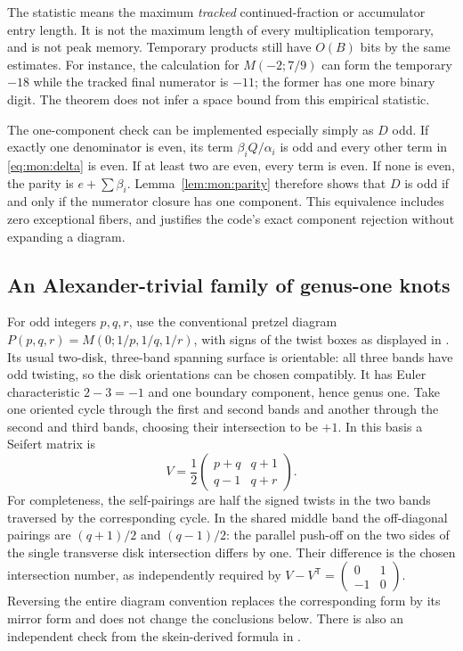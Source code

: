 The statistic  means the maximum \emph{tracked}
continued-fraction or accumulator entry length. It is not the maximum length
of every multiplication temporary, and is not peak memory. Temporary
products still have $O(B)$ bits by the same estimates.
For instance, the calculation for $M(-2;7/9)$ can form the temporary $-18$
while the tracked final numerator is $-11$; the former has one more binary
digit. The theorem does not infer a space bound from this empirical statistic.

The one-component check can be implemented especially simply as $D$ odd.
If exactly one denominator is even, its term $\beta_i Q/\alpha_i$ is odd
and every other term in \eqref{eq:mon:delta} is even. If at least two are
even, every term is even. If none is even, the parity is
$e+\sum\beta_i$. Lemma~\ref{lem:mon:parity} therefore shows that $D$ is odd
if and only if the numerator closure has one component. This equivalence
includes zero exceptional fibers, and justifies the code's exact component
rejection without expanding a diagram.

\subsection{An Alexander-trivial family of genus-one knots}

For odd integers $p,q,r$, use the conventional pretzel diagram
$P(p,q,r)=M(0;1/p,1/q,1/r)$, with signs of the twist boxes as displayed in
\cite[Figure~1 and Theorem~1(3)]{belousov-pretzel}.  Its usual two-disk,
three-band spanning surface is orientable: all three bands have odd twisting,
so the disk orientations can be chosen compatibly.  It has Euler characteristic
$2-3=-1$ and one boundary component, hence genus one.
Take one oriented cycle through the first and second bands and another through
the second and third bands, choosing their intersection to be $+1$.
In this basis a Seifert matrix is
\begin{equation}\label{eq:mon:pretzel-seifert}
 V=\frac12\begin{pmatrix}p+q&q+1\\q-1&q+r\end{pmatrix}.
\end{equation}
For completeness, the self-pairings are half the signed twists in the two
bands traversed by the corresponding cycle.  In the shared middle band the
off-diagonal pairings are $(q+1)/2$ and $(q-1)/2$: the parallel push-off on
the two sides of the single transverse disk intersection differs by one.
Their difference is the chosen intersection number, as independently required
by $V-V^{\mathsf T}=\left(\begin{smallmatrix}0&1\\-1&0\end{smallmatrix}\right)$.
Reversing the entire diagram convention replaces the corresponding form by
its mirror form and does not change the conclusions below.  There is also
an independent check from the skein-derived formula in
\cite[Theorem~1(3)]{belousov-pretzel}.

